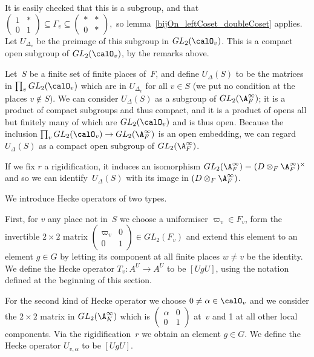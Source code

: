 It is easily checked that this is a subgroup, and that
$\begin{pmatrix}1&*\\0&1\end{pmatrix}\subseteq\Gamma_v\subseteq\begin{pmatrix}*&*\\0&*\end{pmatrix},$
so lemma~\ref{bijOn_leftCoset_doubleCoset} applies.
Let $U_{\Delta_v}$ be the preimage of this subgroup in $GL_2(\calO_v)$.
This is a compact open subgroup of $GL_2(\calO_v)$, by the remarks above.

Let~$S$ be a finite set of finite places of~$F$, and define $U_\Delta(S)$ to be the matrices
in $\prod_v GL_2(\calO_v)$ which are in $U_{\Delta_v}$ for all $v\in S$ (we put no condition
at the places $v\notin S$). We can consider
$U_{\Delta}(S)$ as a subgroup of $GL_2(\A_F^\infty)$; it is a product of compact subgroups
and thus compact, and it is a product of opens all but finitely many of which are $GL_2(\calO_v)$
and is thus open. Because the inclusion $\prod_v GL_2(\calO_v)\to GL_2(\A_F^\infty)$ is an
open embedding, we can regard $U_\Delta(S)$ as a compact open subgroup of $GL_2(\A_F^\infty)$.

If we fix $r$ a rigidification, it
induces an isomorphism $GL_2(\A_F^\infty)=(D\otimes_F\A_F^\infty)^\times$
and so we can identify~$U_\Delta(S)$ with its image in $(D\otimes_F\A_F^\infty)$.

We introduce Hecke operators of two types.

First, for $v$ any place not in~$S$ we choose a uniformiser $\varpi_v\in F_v$,
form the invertible $2\times 2$ matrix $\begin{pmatrix}\varpi_v&0\\0&1\end{pmatrix}\in GL_2(F_v)$
and extend this element to an element $g\in G$ by letting its component at all finite places
$w\not=v$ be the identity. We define the Hecke operator $T_v:A^U\to A^U$ to be $[UgU]$, using the
notation defined at the beginning of this section.

For the second kind of Hecke operator we choose
$0\not=\alpha\in\calO_v$ and we consider the $2\times 2$ matrix in $GL_2(\A_K^\infty)$
which is $\begin{pmatrix}\alpha&0\\0&1\end{pmatrix}$ at~$v$ and 1 at all other local components.
Via the rigidification~$r$ we obtain an element $g\in G$.
We define the Hecke operator $U_{v,\alpha}$ to be $[UgU]$.

